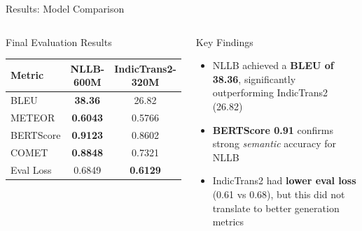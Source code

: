 \documentclass[aspectratio=169]{beamer}
\begin{document}
\begin{frame}{Results: Model Comparison}
\begin{columns}[T]
    \begin{block}{Final Evaluation Results}
      \centering
      \begin{tabular}{lcc}
        \toprule
        \textbf{Metric} & \textbf{NLLB-600M} & \textbf{IndicTrans2-320M} \\
        \midrule
        BLEU        & \textbf{38.36} & 26.82 \\
        METEOR      & \textbf{0.6043} & 0.5766 \\
        BERTScore   & \textbf{0.9123} & 0.8602 \\
        COMET       & \textbf{0.8848} & 0.7321 \\
        \midrule
        Eval Loss   & 0.6849 & \textbf{0.6129} \\
        \bottomrule
      \end{tabular}
    \end{block}
    \begin{alertblock}{Key Findings}
      \begin{itemize}
        \item NLLB achieved a \textbf{BLEU of 38.36}, significantly outperforming IndicTrans2 (26.82)
        \item \textbf{BERTScore 0.91} confirms strong \textit{semantic} accuracy for NLLB
        \item IndicTrans2 had \textbf{lower eval loss} (0.61 vs 0.68), but this did not translate to better generation metrics
      \end{itemize}
    \end{alertblock}
\end{columns}
\end{frame}
\end{document}
